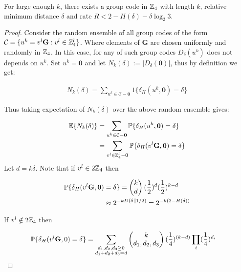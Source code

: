 \begin{lem}\label{lem: code_existence}
For large enough $k$, there exists a group code in $\mathbb{Z}_4$ with length $k$, relative minimum distance  $\delta$ and rate $R< 2-H(\delta)-\delta \log_2 3 $. 
\end{lem}

\begin{proof}

Consider the random ensemble of all group codes of the form $\mathcal{C}=\{ u^k=v^l\mathbf{G}: v^l\in \mathbb{Z}_4^l\}$. Where elements of $\mathbf{G}$ are chosen uniformly and randomly in $\mathbb{Z}_4$. In this case, for any of such group codes $D_{\delta}(u^k)$ does not depends on $u^k$. Set $u^k=\mathbf{0}$ and let $N_k(\delta):=|D_{\delta}(\mathbf{0})|$, thus by definition we get:  

\begin{align*}
N_k(\delta)=\sum_{u^k\in \mathcal{C}-\mathbf{0}} 1\{ \delta_H(u^k,\mathbf{0})=\delta \}
\end{align*}

Thus taking expectation of $N_k(\delta)$ over the above random ensemble gives:

\begin{align*}
\mathbb{E}\{ N_k(\delta)\}&=\sum_{u^k\in \mathcal{C}-\mathbf{0}} \mathbb{P}\{ \delta_H(u^k,\mathbf{0})=\delta \}\\
&= \sum_{v^l \in \mathbb{Z}_4^l- \mathbf{0}} \mathbb{P}\{ \delta_H(v^l\mathbf{G},\mathbf{0})=\delta \}
\end{align*} 
Let $d=k\delta$. Note that if $v^l \in 2\mathbb{Z}_4 $ then 


\begin{align*}
\mathbb{P}\{ \delta_H(v^l\mathbf{G},\mathbf{0})&=\delta \}= \begin{pmatrix} k\\ d \end{pmatrix} (\frac{1}{2})^{d} (\frac{1}{2})^{k-d}\\
&\approx2^{-kD(\delta \|1/2)}=2^{-k(2-H(\delta))}
\end{align*}

If $v^l \notin 2\mathbb{Z}_4 $ then 

\begin{align*}
\mathbb{P}\{ \delta_H(v^l\mathbf{G},0)&=\delta \}= \sum_{\substack{d_1,d_2,d_3 \geq 0\\ d_1+d_2+d_3=d}}\begin{pmatrix} k\\ d_1,d_2,d_3  \end{pmatrix} (\frac{1}{4})^{(k-d)} \prod_i (\frac{1}{4})^{d_i}
\end{align*}


\end{proof}
